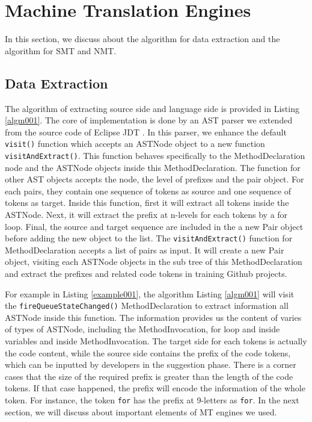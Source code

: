 \section{Machine Translation Engines}
In this section, we discuss about the algorithm for data extraction and the algorithm for SMT and NMT.
\subsection{Data Extraction}
The algorithm of extracting source side and language side is provided in Listing \ref{algm001}. The core of implementation is done by an AST parser we extended from the source code of Eclipse JDT \cite{032}. In this parser, we enhance the default \texttt{visit()} function which accepts an ASTNode object to a new function \texttt{visitAndExtract()}. This function behaves specifically to the MethodDeclaration node and the ASTNode objects inside this MethodDeclaration. The function for other AST objects accepts the node, the level of prefixes and the pair object. For each pairs, they contain one sequence of tokens as source and one sequence of tokens as target. Inside this function, first it will extract all tokens inside the ASTNode. Next, it will extract the prefix at n-levels for each tokens by a for loop. Final, the source and target sequence are included in the a new Pair object before adding the new object to the list. The \texttt{visitAndExtract()} function for MethodDeclaration accepts a list of pairs as input. It will create a new Pair object, visiting each ASTNode objects in the sub tree of this MethodDeclaration and extract the prefixes and related code tokens in training Github projects. 

For example in Listing \ref{example001}, the algorithm Listing \ref{algm001} will visit the \texttt{fireQueueStateChanged()} MethodDeclaration to extract information all ASTNode inside this function. The information provides us the content of varies of types of ASTNode, including the MethodInvocation, for loop and inside variables and inside MethodInvocation. The target side for each tokens is actually the code content, while the source side contains the prefix of the code tokens, which can be inputted by developers in the suggestion phase. There is a corner cases that the size of the required prefix is greater than the length of the code tokens. If that case happened, the prefix will encode the information of the whole token. For instance, the token \texttt{for} has the prefix at 9-letters as \texttt{for}. In the next section, we will discuss about important elements of MT engines we used. 


